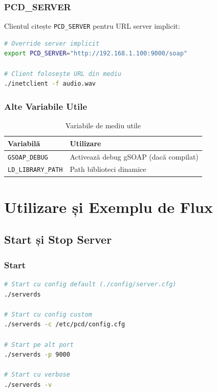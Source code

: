 \documentclass[12pt,a4paper,oneside]{book}
\begin{document}
\subsection{PCD\_SERVER}

Clientul citește \texttt{PCD\_SERVER} pentru URL server implicit:

\begin{lstlisting}[language=bash]
# Override server implicit
export PCD_SERVER="http://192.168.1.100:9000/soap"

# Client folosește URL din mediu
./inetclient -f audio.wav
\end{lstlisting}

\subsection{Alte Variabile Utile}

\begin{table}[H]
\centering
\begin{tabularx}{\textwidth}{|l|X|}
\hline
\textbf{Variabilă} & \textbf{Utilizare} \\
\hline
\texttt{GSOAP\_DEBUG} & Activează debug gSOAP (dacă compilat) \\
\hline
\texttt{LD\_LIBRARY\_PATH} & Path biblioteci dinamice \\
\hline
\end{tabularx}
\caption{Variabile de mediu utile}
\end{table}

\newpage

\chapter{Utilizare și Exemplu de Flux}

\section{Start și Stop Server}

\subsection{Start}

\begin{lstlisting}[language=bash]
# Start cu config default (./config/server.cfg)
./serverds

# Start cu config custom
./serverds -c /etc/pcd/config.cfg

# Start pe alt port
./serverds -p 9000

# Start cu verbose
./serverds -v
\end{lstlisting}
\end{document}

